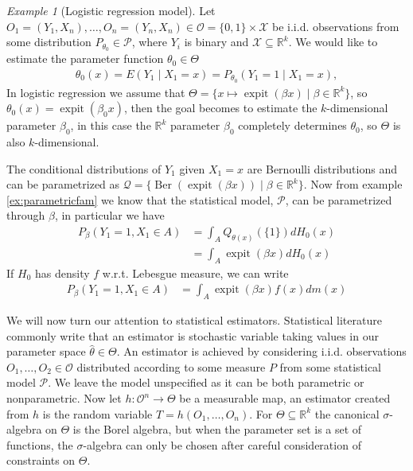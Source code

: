 \documentclass[11pt, a4paper]{article}
\theoremstyle{definition}
\theoremstyle{remark}
\newtheorem{example}{Example}
\DeclareMathOperator{\expit}{expit}
\begin{document}
\begin{example}[Logistic regression model] \label{logregmod}
    Let $ O_1 = (Y_1 , X_n) , \ldots, O_n = (Y_n , X_n) \in \mathcal{O} = \{0,1\} \times \mathcal{X} $ be i.i.d. observations from some distribution $ P_{\theta_0} \in \mathcal{P} $, where $ Y_i $ is binary and $ \mathcal{X} \subseteq \mathbb{R}^{k} $. We would like to estimate the parameter function $ \theta_{0} \in \Theta $
\begin{align*}
    \theta_0(x) = E(Y_1 \mid X_1 = x) = P_{\theta_0}(Y_1 = 1 \mid X_1 = x),
\end{align*}
In logistic regression we assume that $ \Theta = \{x \mapsto \expit(\beta x) \mid \beta \in \mathbb{R}^{k}\} $, so $ \theta_0(x) = \expit(\beta_0 x) $, then the goal becomes to estimate the $ k $-dimensional parameter $ \beta_0 $, in this case the $ \mathbb{R}^{k} $ parameter $ \beta_0  $ completely determines $ \theta_0 $, so $ \Theta $ is also $ k $-dimensional. %

The conditional distributions of $ Y_1 $ given $ X_1 = x $ are Bernoulli distributions and can be parametrized as $ \mathcal{Q} = \{\operatorname{Ber}(\expit(\beta x )) \mid \beta \in \mathbb{R}^{k}  \}  $. Now from example \ref{ex:parametricfam} we know that the statistical model, $ \mathcal{P} $, can be parametrized through $ \beta $, in particular we have 
\begin{align*}
    P_{\beta}(Y_1= 1 , X_1 \in A) &= \int_{A} Q_{\theta(x)}(\{1\}) dH_{0}(x)\\
 &= \int_{A} \expit(\beta x )  d H_0(x) 
\end{align*}
If $ H_{0} $ has density $ f $ w.r.t. Lebesgue measure, we can write
\begin{align*}
    P_{\beta}(Y_1= 1 , X_1 \in A) &= \int_{A} \expit(\beta x ) f(x)  d m(x) 
\end{align*}
\end{example}
We will now turn our attention to statistical estimators. Statistical literature commonly write that an estimator is stochastic variable taking values in our parameter space $ \hat{\theta} \in \Theta  $. An estimator is achieved by considering i.i.d. observations $ O_1 , \ldots, O_2 \in\mathcal{O} $ distributed according to some measure $ P $ from some statistical model $ \mathcal{P} $. We leave the model unspecified as it can be both parametric or nonparametric. Now let $ h : \mathcal{O}^{n} \to \Theta $ be a measurable map, an estimator created from $ h $ is the random variable $ T = h(O_1 , \ldots, O_n) $. For $ \Theta \subseteq \mathbb{R}^{k} $ the canonical $ \sigma $-algebra on $ \Theta $ is the Borel algebra, but when the parameter set is a set of functions, the $ \sigma $-algebra can only be chosen after careful consideration of constraints on $ \Theta $. 
\end{document}
